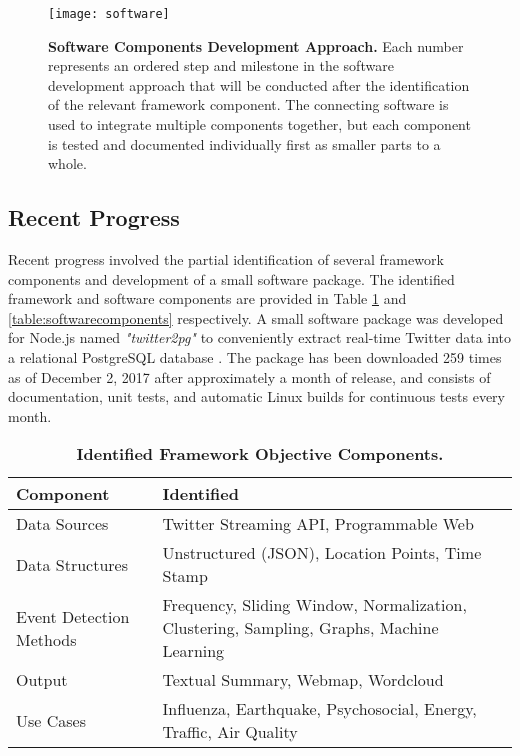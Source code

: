 \begin{figure}[!htb]
	\centering
	\texttt{[image: software]}
	\caption{\textbf{Software Components Development Approach.} Each number represents an ordered step and milestone in the software development approach that will be conducted after the identification of the relevant framework component. The connecting software is used to integrate multiple components together, but each component is tested and documented individually first as smaller parts to a whole.}
	\label{figure:software}
\end{figure}

\subsection{Recent Progress} \label{recent-progress}

Recent progress involved the partial identification of several framework components and development of a small software package. The identified framework and software components are provided in Table \ref{table:frameworkcomponents} and \ref{table:softwarecomponents} respectively. A small software package was developed for Node.js \citep{Nodejs:2017} named \textit{"twitter2pg"}  \citep{Wen:2017} to conveniently extract real-time Twitter data into a relational PostgreSQL database \citep{Postgresql:2017}. The package has been downloaded 259 times as of December 2, 2017 after approximately a month of release, and consists of documentation, unit tests, and automatic Linux builds for continuous tests every month.

\begin{table}[!htb]
\centering
\caption{\textbf{Identified Framework Objective Components.}}
\label{table:frameworkcomponents}
\begin{tabular}{|p{2.5in}|p{3.5in}|}
\hline
\textbf{Component} & \textbf{Identified}\\
\hline
Data Sources & Twitter Streaming API, Programmable Web\\
\hline
Data Structures & Unstructured (JSON), Location Points, Time Stamp \\
\hline
Event Detection Methods & Frequency, Sliding Window, Normalization, Clustering, Sampling, Graphs, Machine Learning\\
\hline
Output & Textual Summary, Webmap, Wordcloud\\
\hline
Use Cases & Influenza, Earthquake, Psychosocial, Energy, Traffic, Air Quality\\
\hline
\end{tabular}
\end{table}

